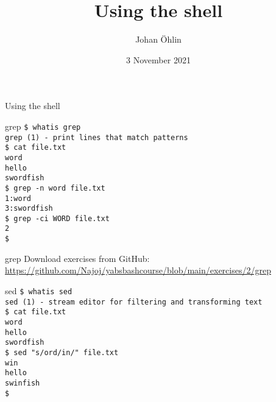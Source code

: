 \documentclass{beamer}
\title{Using the shell}
\date{3 November 2021}
\author{Johan Öhlin}
\institute{Yabs}
\let\tt\texttt
\begin{document}
\begin{frame}{Using the shell}
\maketitle
\end{frame}

\begin{frame}{grep}
        \tt{\$ whatis grep}\\
        \tt{grep (1)  - print lines that match patterns}\\
        \tt{\$ cat file.txt} \\
        \tt{word} \\
        \tt{hello} \\
        \tt{swordfish} \\
        \tt{\$ grep -n word     file.txt} \\
        \tt{1:word} \\
        \tt{3:swordfish} \\
        \tt{\$ grep -ci WORD    file.txt} \\
        \tt{2} \\
        \tt{\$ } \\
\end{frame}

\begin{frame}{grep}
        Download exercises from GitHub: \\
        \url{https://github.com/Najoj/yabsbashcourse/blob/main/exercises/2/grep}
\end{frame}

\begin{frame}{sed}
        \tt{\$ whatis sed}\\
        \tt{sed (1)   - stream editor for filtering and transforming text}\\
        \tt{\$ cat file.txt} \\
        \tt{word} \\
        \tt{hello} \\
        \tt{swordfish} \\
        \tt{\$ sed "s/ord/in/" file.txt} \\
        \tt{win} \\
        \tt{hello} \\
        \tt{swinfish} \\
        \tt{\$ } \\
\end{frame}
\end{document}
